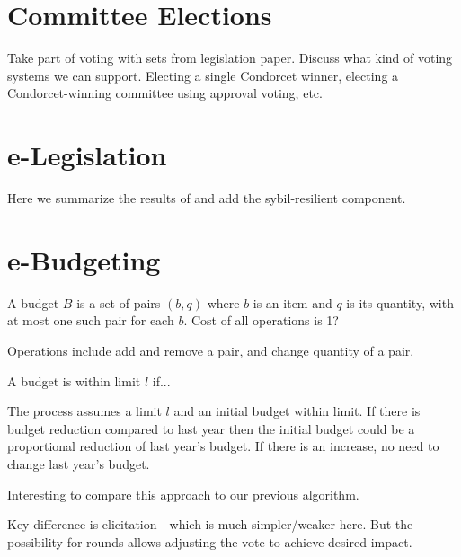 \documentclass{llncs}
\begin{document}
\section{Committee Elections}

Take part of voting with sets from legislation paper.
Discuss what kind of voting systems we can support.
Electing a single Condorcet winner, electing a Condorcet-winning committee using approval voting, etc.

\section{e-Legislation}

Here we summarize the results of \cite{legislation} and add the sybil-resilient component.

\section{e-Budgeting}

A budget $B$ is a set of pairs $(b,q)$ where $b$ is an item and $q$ is its quantity, with at most one such pair for each $b$.
Cost of all operations is 1?

Operations include add and remove a pair, and change quantity of a pair.

A budget is within limit $l$ if...

The process assumes a limit $l$ and an initial budget within limit. If there is budget reduction compared to last year then the initial budget could be a proportional reduction of last year's budget.  If there is an increase, no need to change last year's budget.

Interesting to compare this approach to our previous algorithm.

Key difference is elicitation - which is much simpler/weaker here.
But the possibility for rounds allows adjusting the vote to achieve desired impact.
\end{document}
